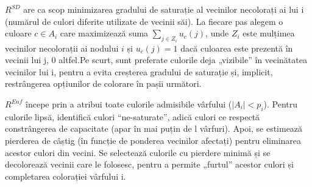 \begin{algorithm}[H]
\caption{$R^{SD}$}\label{alg:RSD}
\begin{algorithmic}[1]
\small
{}
\EndWhile{}
\end{algorithmic}
\end{algorithm}
$R^{SD}$  are ca scop  minimizarea gradului de saturație al vecinilor necolorați ai lui i (numărul de culori diferite utilizate de vecinii săi). La fiecare pas alegem o culoare $c \in A_i$ care maximizează suma $\sum_{j \in Z_i} u_c(j)$, unde $Z_i$ este mulțimea vecinilor necolorații ai nodului $i$ și $u_c(j)=1$ dacă culoarea este prezentă în vecinii lui j, 0 altfel.Pe scurt, sunt preferate culorile deja „vizibile” în vecinătatea vecinilor lui i, pentru a evita creșterea gradului de saturație și, implicit, restrângerea opțiunilor de colorare în pașii următori.
\vspace{1cm}
\begin{algorithm}[H]
\caption{$R^{Enf}$}\label{alg:RENF}
\begin{algorithmic}[1]
\small
    \EndFor{}
        \EndFor{}
    \EndWhile{}

\end{algorithmic}
\end{algorithm}

      


$R^{Enf}$  începe prin a atribui toate culorile admisibile vârfului ($|A_i|<p_i$). Pentru culorile lipsă, identifică culori ``ne-saturate'', adică culori ce respectă constrângerea de capacitate (apar în mai puțin de l vârfuri). Apoi, se estimează pierderea de câștig (în funcție de ponderea vecinilor afectați) pentru eliminarea acestor culori din vecini. Se selectează culorile cu pierdere minimă și se decolorează vecinii care le folosesc, pentru a permite „furtul” acestor culori și completarea colorației vârfului i.






